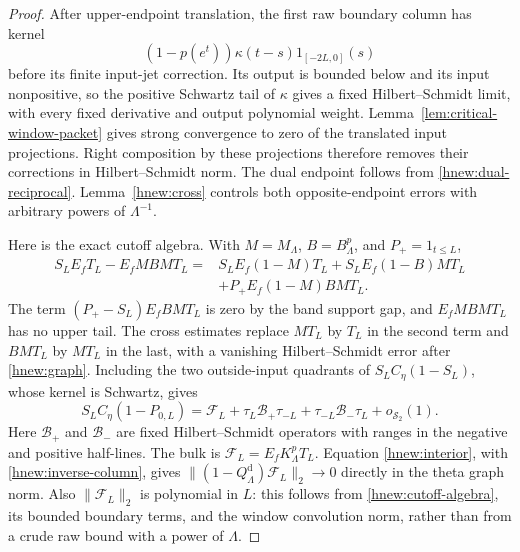 \begin{proof}
After upper-endpoint translation, the first raw boundary column
has kernel
\[
 (1-p(e^t))\kappa(t-s)1_{[-2L,0]}(s)
\]
before its finite input-jet correction.  Its output is bounded
below and its input nonpositive, so the positive Schwartz tail
of $\kappa$ gives a fixed Hilbert--Schmidt limit, with every
fixed derivative and output polynomial weight.
Lemma~\ref{lem:critical-window-packet} gives strong convergence
to zero of the translated input projections.  Right composition
by these projections therefore removes their corrections in
Hilbert--Schmidt norm.  The dual endpoint follows from
\eqref{hnew:dual-reciprocal}.  Lemma~\ref{hnew:cross} controls both
opposite-endpoint errors with arbitrary powers of $\Lambda^{-1}$.

Here is the exact cutoff algebra.  With $M=M_\Lambda$,
$B=B_\Lambda^p$, and $P_+=1_{t\le L}$,
\begin{align}\label{hnew:cutoff-algebra}
 S_LE_fT_L-E_fMBMT_L
   ={}&S_LE_f(1-M)T_L+S_LE_f(1-B)MT_L\\
      &+P_+E_f(1-M)BMT_L.\nonumber
\end{align}
The term $(P_+-S_L)E_fBMT_L$ is zero by the
band support gap, and $E_fMBMT_L$ has no upper tail.
The cross estimates replace $MT_L$ by $T_L$ in the second
term and $BMT_L$ by $MT_L$ in the last, with a vanishing
Hilbert--Schmidt error after \eqref{hnew:graph}.
Including the two outside-input quadrants of
$S_LC_\eta(1-S_L)$, whose kernel is Schwartz, gives
\begin{equation}\label{hnew:endpoint-decomposition}
 S_LC_\eta(1-P_{0,L})
   =\mathcal F_L+\tau_L\mathcal B_+\tau_{-L}
           +\tau_{-L}\mathcal B_-\tau_L+o_{\mathcal S_2}(1).
\end{equation}
Here $\mathcal B_+$ and $\mathcal B_-$ are fixed Hilbert--Schmidt
operators with ranges in the negative and positive half-lines.
The bulk is $\mathcal F_L=E_fK_\Lambda^pT_L$.
Equation \eqref{hnew:interior}, with
\eqref{hnew:inverse-column}, gives
$\|(1-Q_\Lambda^{\mathrm d})\mathcal F_L\|_2\to0$ directly
in the theta graph norm.  Also $\|\mathcal F_L\|_2$ is polynomial
in $L$: this follows from \eqref{hnew:cutoff-algebra}, its bounded
boundary terms, and the window convolution norm, rather than
from a crude raw bound with a power of $\Lambda$.


\end{proof}
